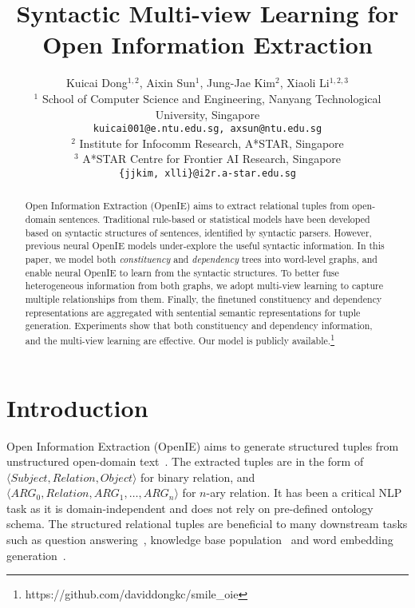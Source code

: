 \documentclass[11pt]{article}
\title{Syntactic Multi-view Learning for Open Information Extraction}
\author{Kuicai Dong$^{1,2}$, Aixin Sun$^1$, Jung-Jae Kim$^2$, Xiaoli Li$^{1,2,3}$ \\
\fontsize{11pt}{12pt}\selectfont
$^1$ School of Computer Science and Engineering, Nanyang Technological University, Singapore\\
\fontsize{11pt}{12pt}\selectfont
\texttt{kuicai001@e.ntu.edu.sg, axsun@ntu.edu.sg}\\
\fontsize{11pt}{12pt}\selectfont
$^2$ Institute for Infocomm Research, A*STAR, Singapore\\
\fontsize{11pt}{12pt}\selectfont
$^3$ A*STAR Centre for Frontier AI Research, Singapore\\
\fontsize{11pt}{12pt}\selectfont
\texttt{\{jjkim, xlli\}@i2r.a-star.edu.sg}}
\begin{document}
\maketitle
\begin{abstract}

Open Information Extraction (OpenIE) aims to extract relational tuples from open-domain sentences. 
Traditional rule-based or statistical models have been developed based on syntactic structures of sentences, identified by syntactic parsers. However, previous neural OpenIE models under-explore the useful syntactic information.
In this paper, we model both \textit{constituency} and \textit{dependency} trees into word-level graphs, and enable neural OpenIE to learn from the syntactic structures. 
To better fuse heterogeneous information from both graphs, we adopt multi-view learning to capture multiple relationships from them. Finally, the finetuned constituency and dependency representations are aggregated with sentential semantic representations for tuple generation. 
Experiments show that both constituency and dependency information, and the multi-view learning are effective. Our model is publicly available.\footnote{https://github.com/daviddongkc/smile\_oie}

\end{abstract}


\section{Introduction}\label{sec:intro}




Open Information Extraction (OpenIE) aims to generate structured tuples from unstructured open-domain text~\cite{yates2007textrunner}.
The extracted tuples are in the form of $\langle Subject, Relation, Object \rangle$ for binary relation, and $\langle ARG_0, Relation, ARG_1, \dots, ARG_n \rangle$ for $n$-ary relation.
It has been a critical NLP task as it is domain-independent  and does not rely on pre-defined ontology schema. The structured relational tuples are beneficial to many  downstream tasks such as question answering~\cite{khot2017answering}, knowledge base population~\cite{martinez2018openie, gashteovski2020aligning} and word embedding generation~\cite{stanovsky2015open}.
\end{document}
